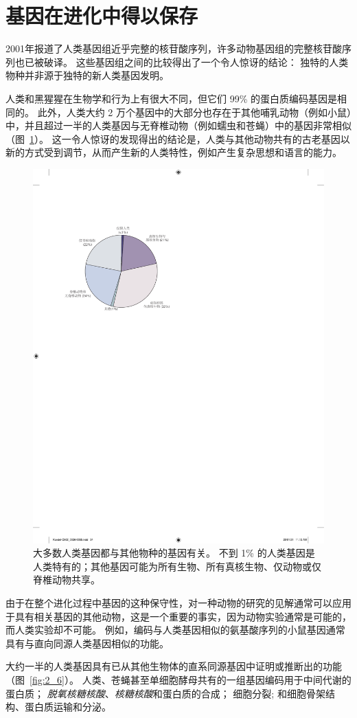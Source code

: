 \section{基因在进化中得以保存}

2001年报道了人类基因组近乎完整的核苷酸序列，许多动物基因组的完整核苷酸序列也已被破译。
这些基因组之间的比较得出了一个令人惊讶的结论：
独特的人类物种并非源于独特的新人类基因发明。


人类和黑猩猩在生物学和行为上有很大不同，但它们 99\% 的蛋白质编码基因是相同的。
此外，人类大约 2 万个基因中的大部分也存在于其他哺乳动物（例如小鼠）中，并且超过一半的人类基因与无脊椎动物（例如蠕虫和苍蝇）中的基因非常相似（图~\ref{fig:2_5}）。
这一令人惊讶的发现得出的结论是，人类与其他动物共有的古老基因以新的方式受到调节，从而产生新的人类特性，例如产生复杂思想和语言的能力。


\begin{figure}[htbp]
	\centering
	\includegraphics[width=0.5\linewidth]{chap02/fig_2_5}
	\caption{大多数人类基因都与其他物种的基因有关。
		不到 1\% 的人类基因是人类特有的；其他基因可能为所有生物、所有真核生物、仅动物或仅脊椎动物共享\cite{international2001initial}。}
	\label{fig:2_5}
\end{figure}


由于在整个进化过程中基因的这种保守性，对一种动物的研究的见解通常可以应用于具有相关基因的其他动物，这是一个重要的事实，因为动物实验通常是可能的，而人类实验却不可能。
例如，编码与人类基因相似的氨基酸序列的小鼠基因通常具有与直向同源人类基因相似的功能。


大约一半的人类基因具有已从其他生物体的直系同源基因中证明或推断出的功能（图~\ref{fig:2_6}）。
人类、苍蝇甚至单细胞酵母共有的一组基因编码用于中间代谢的蛋白质；
\textit{脱氧核糖核酸}、\textit{核糖核酸}和蛋白质的合成；
细胞分裂; 和细胞骨架结构、蛋白质运输和分泌。


